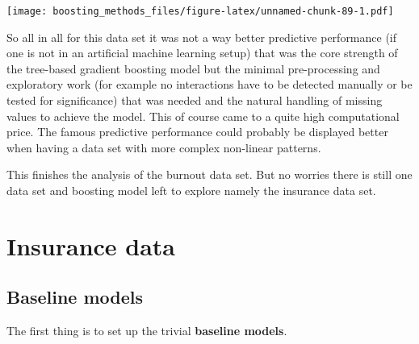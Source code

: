 \documentclass[
]{book}
\newenvironment{Shaded}{\begin{snugshade}}{\end{snugshade}}
\newcommand{\AttributeTok}[1]{\textcolor[rgb]{0.77,0.63,0.00}{#1}}
\newcommand{\CommentTok}[1]{\textcolor[rgb]{0.56,0.35,0.01}{\textit{#1}}}
\newcommand{\ControlFlowTok}[1]{\textcolor[rgb]{0.13,0.29,0.53}{\textbf{#1}}}
\newcommand{\FunctionTok}[1]{\textcolor[rgb]{0.00,0.00,0.00}{#1}}
\newcommand{\NormalTok}[1]{#1}
\newcommand{\OtherTok}[1]{\textcolor[rgb]{0.56,0.35,0.01}{#1}}
\newcommand{\SpecialCharTok}[1]{\textcolor[rgb]{0.00,0.00,0.00}{#1}}
\begin{document}
\texttt{[image: boosting\_methods\_files/figure-latex/unnamed-chunk-89-1.pdf]}

So all in all for this data set it was not a way better predictive performance (if one is not in an artificial machine learning setup) that was the core strength of the tree-based gradient boosting model but the minimal pre-processing and exploratory work (for example no interactions have to be detected manually or be tested for significance) that was needed and the natural handling of missing values to achieve the model. This of course came to a quite high computational price. The famous predictive performance could probably be displayed better when having a data set with more complex non-linear patterns.

This finishes the analysis of the burnout data set. But no worries there is still one data set and boosting model left to explore namely the insurance data set.

\hypertarget{insurance-data}{%
\section{Insurance data}\label{insurance-data}}

\hypertarget{baseline-models-1}{%
\subsection{Baseline models}\label{baseline-models-1}}

The first thing is to set up the trivial \textbf{baseline models}.

\begin{Shaded}
\end{Shaded}
\end{document}
